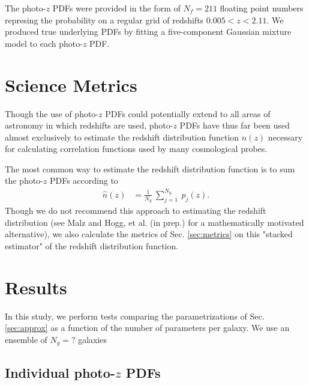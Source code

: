 \documentclass[\docopts]{\docclass}
\newcommand{\pz}{photo-$z$ PDF}
\begin{document}

The \pz s were provided in the form of $N_{f}=211$ floating point numbers 
represing the probability on a regular grid of redshifts $0.005 < z < 2.11$.  
We produced true underlying PDFs by fitting a five-component Gaussian mixture 
model to each \pz .














\section{Science Metrics}
\label{sec:science}

Though the use of \pz s could potentially extend to all areas of astronomy in 
which redshifts are used, \pz s have thus far been used almost exclusively to 
estimate the redshift distribution function $n(z)$ necessary for calculating 
correlation functions used by many cosmological probes.


The most common way to estimate the redshift distribution function is to sum 
the \pz s according to
\begin{align}
  \label{eq:nz}
  \hat{n}(z) &= \frac{1}{N_{g}}\ \sum_{j=1}^{N_{g}}\ p_{j}(z).
\end{align}
Though we do not recommend this approach to estimating the redshift 
distribution (see Malz and Hogg, et al. (in prep.) for a mathematically 
motivated alternative), we also calculate the metrics of Sec. \ref{sec:metrics} 
on this "stacked estimator" of the redshift distribution function.






\section{Results}
\label{sec:results}



In this study, we perform tests comparing the parametrizations of Sec. 
\ref{sec:approx} as a function of the number of parameters per galaxy.  We use 
an ensemble of $N_{g}=?$ galaxies

\subsection{Individual \pz s}
\label{sec:individual}
\end{document}
